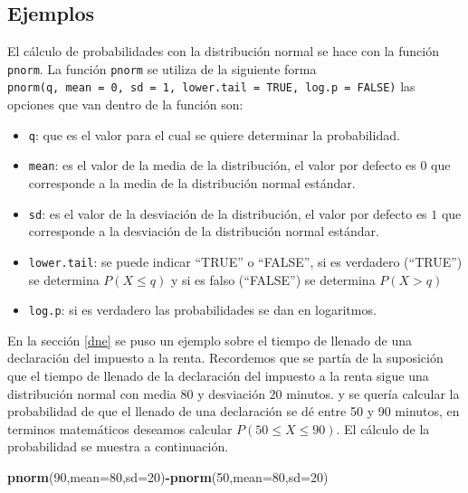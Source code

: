 \documentclass[
]{krantz}
\makeatletter
\newenvironment{Shaded}{\begin{snugshade}}{\end{snugshade}}
\newcommand{\DataTypeTok}[1]{\textcolor[rgb]{0.27,0.27,0.27}{#1}}
\newcommand{\DecValTok}[1]{\textcolor[rgb]{0.06,0.06,0.06}{#1}}
\newcommand{\KeywordTok}[1]{\textcolor[rgb]{0.27,0.27,0.27}{\textbf{#1}}}
\newcommand{\NormalTok}[1]{#1}
\newcommand{\OperatorTok}[1]{\textcolor[rgb]{0.43,0.43,0.43}{\textbf{#1}}}
\providecommand{\tightlist}{%
  \setlength{\itemsep}{0pt}\setlength{\parskip}{0pt}}
\newenvironment{kframe}{%
\medskip{}
\setlength{\fboxsep}{.8em}
 \def\at@end@of@kframe{}%
 \ifinner\ifhmode%
  \def\at@end@of@kframe{\end{minipage}}%
  \begin{minipage}{\columnwidth}%
 \fi\fi%
 \def\FrameCommand##1{\hskip\@totalleftmargin \hskip-\fboxsep
 \colorbox{shadecolor}{##1}\hskip-\fboxsep
     \hskip-\linewidth \hskip-\@totalleftmargin \hskip\columnwidth}%
 \MakeFramed {\advance\hsize-\width
   \@totalleftmargin\z@ \linewidth\hsize
   \@setminipage}}%
 {\par\unskip\endMakeFramed%
 \at@end@of@kframe}
\renewenvironment{Shaded}{\begin{kframe}}{\end{kframe}}
\makeatother
\begin{document}
\hypertarget{ejemplos}{%
\subsection{Ejemplos}\label{ejemplos}}

El cálculo de probabilidades con la distribución normal se hace con la función \texttt{pnorm}. La función \texttt{pnorm} se utiliza de la siguiente forma \texttt{pnorm(q,\ mean\ =\ 0,\ sd\ =\ 1,\ lower.tail\ =\ TRUE,\ log.p\ =\ FALSE)} las opciones que van dentro de la función son:

\begin{itemize}
\tightlist
\item
  \texttt{q}: que es el valor para el cual se quiere determinar la probabilidad.
\item
  \texttt{mean}: es el valor de la media de la distribución, el valor por defecto es \(0\) que corresponde a la media de la distribución normal estándar.
\item
  \texttt{sd}: es el valor de la desviación de la distribución, el valor por defecto es \(1\) que corresponde a la desviación de la distribución normal estándar.
\item
  \texttt{lower.tail}: se puede indicar ``TRUE'' o ``FALSE'', si es verdadero (``TRUE'') se determina \(P\left(X \leq q \right)\) y si es falso (``FALSE'') se determina \(P\left( X > q \right)\)
\item
  \texttt{log.p}: si es verdadero las probabilidades se dan en logaritmos.
\end{itemize}

En la sección \ref{dne} se puso un ejemplo sobre el tiempo de llenado de una declaración del impuesto a la renta. Recordemos que se partía de la suposición que el tiempo de llenado de la declaración del impuesto a la renta sigue una distribución normal con media \(80\) y desviación \(20\) minutos. y se quería calcular la probabilidad de que el llenado de una declaración se dé entre 50 y 90 minutos, en terminos matemáticos deseamos calcular \(P\left( 50 \leq X \leq 90 \right)\). El cálculo de la probabilidad se muestra a continuación.

\begin{Shaded}
\begin{Highlighting}[]
\KeywordTok{pnorm}\NormalTok{(}\DecValTok{90}\NormalTok{,}\DataTypeTok{mean=}\DecValTok{80}\NormalTok{,}\DataTypeTok{sd=}\DecValTok{20}\NormalTok{)}\OperatorTok{-}\KeywordTok{pnorm}\NormalTok{(}\DecValTok{50}\NormalTok{,}\DataTypeTok{mean=}\DecValTok{80}\NormalTok{,}\DataTypeTok{sd=}\DecValTok{20}\NormalTok{)}
\end{Highlighting}
\end{Shaded}
\end{document}
